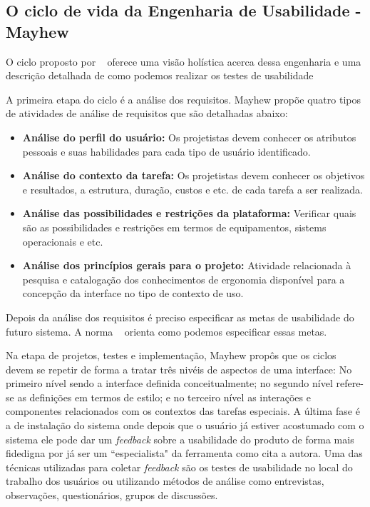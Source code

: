 \subsection{O ciclo de vida da Engenharia de Usabilidade - Mayhew}

	O ciclo proposto por ~ oferece uma visão holística acerca dessa engenharia e uma descrição detalhada de como podemos realizar os testes de usabilidade %

	A primeira etapa do ciclo é a análise dos requisitos. Mayhew propõe quatro tipos de atividades de análise de requisitos que são detalhadas abaixo:

\begin{itemize}
\item \textbf{Análise do perfil do usuário:} Os projetistas devem conhecer os atributos pessoais e suas habilidades para cada tipo de usuário identificado. 
	
\item \textbf{Análise do contexto da tarefa:} Os projetistas devem conhecer os objetivos e resultados, a estrutura, duração, custos e etc. de cada tarefa a ser realizada.

\item \textbf{Análise das possibilidades e restrições da plataforma:} Verificar quais são as possibilidades e restrições em termos de equipamentos, sistems operacionais e etc.

\item \textbf{Análise dos princípios gerais para o projeto:} Atividade relacionada à pesquisa e catalogação dos conhecimentos de ergonomia disponível para a concepção da interface no tipo de contexto de uso.

\end{itemize}

	Depois da análise dos requisitos é preciso especificar as metas de usabilidade do futuro sistema. A norma ~ orienta como podemos especificar essas metas.

	Na etapa de projetos, testes e implementação, Mayhew propôs que os ciclos devem se repetir de forma a tratar três nivéis de aspectos de uma interface: No primeiro nível sendo a interface definida conceitualmente; no segundo nível refere-se as definições em termos de estilo; e no terceiro nível as interações e componentes relacionados com os contextos das tarefas especiais. A última fase é a de instalação do sistema onde depois que o usuário já estiver acostumado com o sistema ele pode dar um \textit{feedback} sobre a usabilidade do produto de forma mais fidedigna por já ser um ``especialista" da ferramenta como cita a autora. 
%
	Uma das técnicas utilizadas para coletar \textit{feedback} são os testes de usabilidade no local do trabalho dos usuários ou utilizando métodos de análise como entrevistas, observações, questionários, grupos de discussões. 


